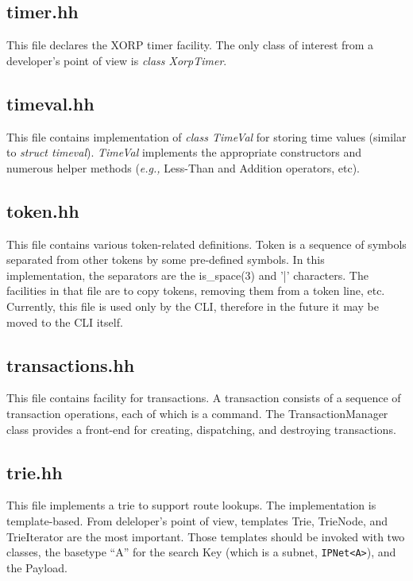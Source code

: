 \documentclass[11pt]{article}
\newcommand{\eg}{\emph{e.g.,}\xspace}
\begin{document}
\subsection{timer.hh}

This file declares the XORP timer facility. The only class of interest
from a developer's point of view is \emph{class XorpTimer}.

\subsection{timeval.hh}

This file contains implementation of \emph{class TimeVal} for 
storing time values (similar to \emph{struct timeval}).
\emph{TimeVal} implements the appropriate constructors and numerous
helper methods (\eg Less-Than and Addition operators, etc).

\subsection{token.hh}

This file contains various token-related definitions. Token is a
sequence of symbols separated from other tokens by some pre-defined
symbols. In this implementation, the separators are the is\_space(3) and
'|' characters.
The facilities in that file are to copy tokens, removing them from a
token line, etc.
Currently, this file is used only by the CLI, therefore in the future it
may be moved to the CLI itself.

\subsection{transactions.hh}

This file contains facility for transactions.  A transaction consists
of a sequence of transaction operations, each of which is a command.
The TransactionManager class provides a front-end for creating,
dispatching, and destroying transactions.

\subsection{trie.hh}

This file implements a trie to support route lookups.
The implementation is template-based. From deleloper's point
of view, templates Trie, TrieNode, and TrieIterator
are the most important. Those templates should be invoked with two
classes, the basetype ``A'' for the search Key (which is a subnet,
\verb=IPNet<A>=), and the Payload.
\end{document}
